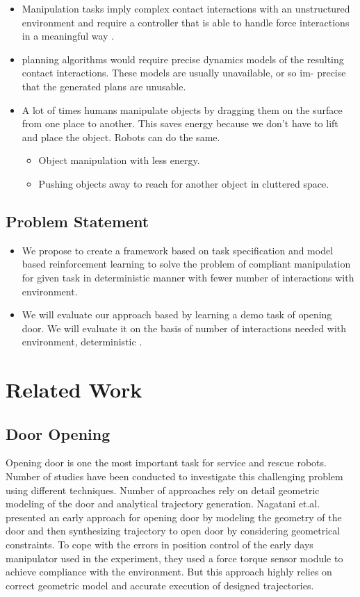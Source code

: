 \documentclass[thesis]{mas_proposal}
\begin{document}
\begin{itemize}
    \item Manipulation tasks imply complex contact interactions with an unstructured environment and require a controller that is able to handle force interactions in a meaningful way \cite{kalakrishnan2011learning}.
    \item planning algorithms would require precise dynamics models of the resulting contact interactions. These models are usually unavailable, or so im- precise that the generated plans are unusable\cite{kalakrishnan2011learning}.
    \item A lot of times humans manipulate objects by dragging them on the surface from one place to another. This saves energy because we don't have to lift and place the object. Robots can do the same. 
    \begin{itemize}
    	\item Object manipulation with less energy.
    	\item Pushing objects away to reach for another object in cluttered space.
    \end{itemize}
\end{itemize}

\section{Problem Statement}
\begin{itemize}
    \item We propose to create a framework based on task specification and model based reinforcement learning to solve the problem of compliant manipulation for given task in deterministic manner with fewer number of interactions with environment.
    \item We will evaluate our approach based by learning a demo task of opening door. We will evaluate it on the basis of number of interactions needed with environment, deterministic .
\end{itemize}


\chapter{Related Work}


\section{Door Opening}

Opening door is one the most important task for service and rescue robots. Number of studies have been conducted to investigate this challenging problem using different techniques. Number of approaches rely on detail geometric modeling of the door and analytical trajectory generation. Nagatani et.al. \cite{nagatani1995experiment} presented an early approach for opening door by modeling the geometry of the door and then synthesizing trajectory to open door by considering geometrical constraints. To cope with the errors in position control of the early days manipulator used in the experiment, they used a force torque sensor module to achieve compliance with the environment. But this approach highly relies on correct geometric model and accurate execution of designed trajectories.
\end{document}
